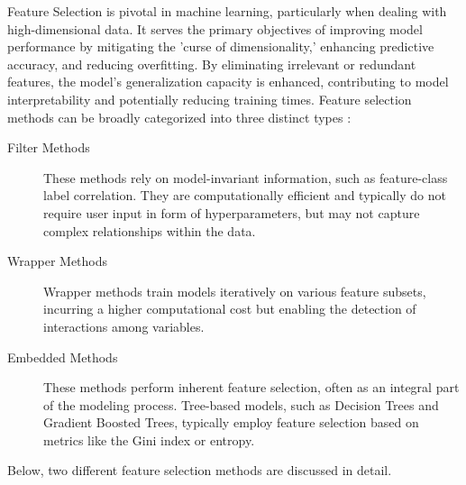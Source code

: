 \documentclass[12pt, a4paper, headinclude, twoside, plainheadsepline, open=right, numbers=noenddot, hidelinks, toc=listof, toc=bibliography]{scrreprt}
\begin{document}
Feature Selection is pivotal in machine learning, particularly when dealing with high-dimensional data. It serves the primary objectives of improving model performance by mitigating the 'curse of dimensionality,' enhancing predictive accuracy, and reducing overfitting. By eliminating irrelevant or redundant features, the model's generalization capacity is enhanced, contributing to model interpretability and potentially reducing training times.
Feature selection methods can be broadly categorized into three distinct types \cite{jovicReviewFeatureSelection2015}:
\begin{description}
\item[Filter Methods] These methods rely on model-invariant information, such as feature-class label correlation. They are computationally efficient and typically do not require user input in form of hyperparameters, but may not capture complex relationships within the data.
\item[Wrapper Methods] Wrapper methods train models iteratively on various feature subsets, incurring a higher computational cost but enabling the detection of interactions among variables.
\item[Embedded Methods] These methods perform inherent feature selection, often as an integral part of the modeling process. Tree-based models, such as Decision Trees and Gradient Boosted Trees, typically employ feature selection based on metrics like the Gini index or entropy.
\end{description}
Below, two different feature selection methods are discussed in detail.
\end{document}
